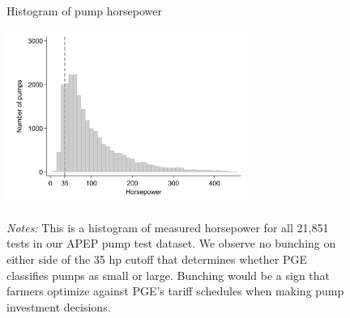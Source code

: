 \documentclass[hidelinks,12pt]{article}
\begin{document}




\begin{figure}[t]
\begin{centering}
\caption{Histogram of pump horsepower}
\label{fig:pump_hist}
\includegraphics[width=0.7\textwidth]{Figures/pump_hist.png}
\caption*{\footnotesize \emph{Notes:} This is a histogram of measured horsepower for all 21,851 tests in our APEP pump test dataset. We observe no bunching on either side of the 35 hp cutoff that determines whether PGE classifies pumps as small or large. Bunching would be a sign that farmers optimize against PGE's tariff schedules when making pump investment decisions.}
\end{centering}
\end{figure}
\end{document}
